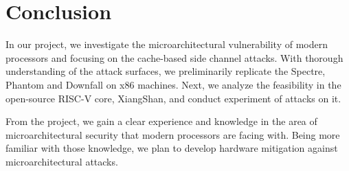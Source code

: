 \section{Conclusion}
In our project, we investigate the microarchitectural vulnerability of modern processors and focusing on the cache-based side channel attacks.
With thorough understanding of the attack surfaces, we preliminarily replicate the Spectre, Phantom and Downfall on x86 machines.
Next, we analyze the feasibility in the open-source RISC-V core, XiangShan, and conduct experiment of attacks on it.

From the project, we gain a clear experience and knowledge in the area of microarchitectural security that modern processors are facing with.
Being more familiar with those knowledge, we plan to develop hardware mitigation against microarchitectural attacks.